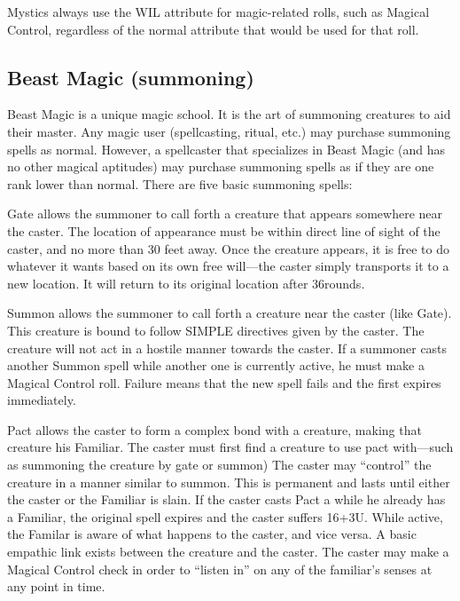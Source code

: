 \documentclass[twoside]{book}
\begin{document}
                  Mystics always use the WIL attribute for
                 magic-related rolls, such as Magical Control, regardless
                 of the normal attribute that would be used for that
                 roll. 
            
\subsection{Beast Magic (summoning)}
      Beast Magic is a unique magic school. It is the art
               of summoning creatures to aid their master. Any magic user
               (spellcasting, ritual, etc.) may purchase summoning spells
               as normal. However, a spellcaster that specializes in
               Beast Magic (and has no other magical aptitudes) may
               purchase summoning spells as if they are one rank lower
               than normal.   There are five basic summoning spells:   
              
                  Gate   allows the summoner
                  to call forth a creature that appears somewhere near
                  the caster. The location of appearance must be within
                  direct line of sight of the caster, and no more than 30
                  feet away. Once the creature appears, it is free to do
                  whatever it wants based on its own free will—the
                  caster simply transports it to a new location. It will
                  return to its original location after 36rounds.
                
              
                  Summon   allows the summoner
                  to call forth a creature near the caster (like Gate).
                  This creature is bound to follow SIMPLE directives
                  given by the caster. The creature will not act in a
                  hostile manner towards the caster. If a summoner casts
                  another Summon spell while another one is currently
                  active, he must make a Magical Control roll. Failure
                  means that the new spell fails and the first expires
                  immediately.
                
              
                  Pact   allows the caster to
                  form a complex bond with a creature, making that
                  creature his Familiar. The caster must first find a
                  creature to use pact with—such as summoning the
                  creature by gate or summon) The caster may
                  “control” the creature in a manner similar
                  to summon. This is permanent and lasts until either the
                  caster or the Familiar is slain. If the caster casts
                  Pact a while he already has a Familiar, the original
                  spell expires and the caster suffers 16+3U. While
                  active, the Familar is aware of what happens to the
                  caster, and vice versa. A basic empathic link exists
                  between the creature and the caster. The caster may
                  make a Magical Control check in order to “listen
                  in” on any of the familiar’s senses at any
                  point in time.
                
\end{document}
